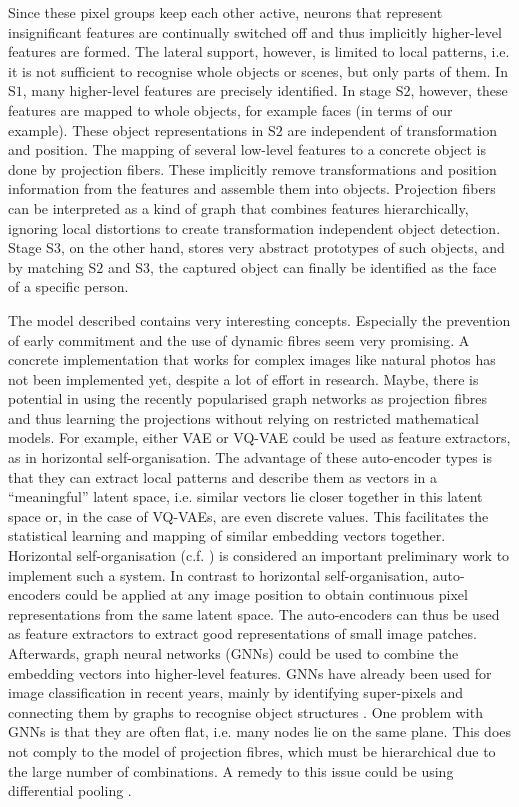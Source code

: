 Since these pixel groups keep each other active, neurons that represent insignificant features are continually switched off and thus implicitly higher-level features are formed. The lateral support, however, is limited to local patterns, i.e. it is not sufficient to recognise whole objects or scenes, but only parts of them. In S$1$, many higher-level features are precisely identified. In stage S$2$, however, these features are mapped to whole objects, for example faces (in terms of our example). These object representations in S$2$ are independent of transformation and position. The mapping of several low-level features to a concrete object is done by projection fibers. These implicitly remove transformations and position information from the features and assemble them into objects. Projection fibers can be interpreted as a kind of graph that combines features hierarchically, ignoring local distortions to create transformation independent object detection. Stage S$3$, on the other hand, stores very abstract prototypes of such objects, and by matching S$2$ and S$3$, the captured object can finally be identified as the face of a specific person.

The model described contains very interesting concepts. Especially the prevention of early commitment and the use of dynamic fibres seem very promising. A concrete implementation that works for complex images like natural photos has not been implemented yet, despite a lot of effort in research. Maybe,  there is potential in using the recently popularised graph networks as projection fibres and thus learning the projections without relying on restricted mathematical models. For example, either VAE or VQ-VAE could be used as feature extractors, as in horizontal self-organisation. The advantage of these auto-encoder types is that they can extract local patterns and describe them as vectors in a ``meaningful'' latent space, i.e. similar vectors lie closer together in this latent space or, in the case of VQ-VAEs, are even discrete values. This facilitates the statistical learning and mapping of similar embedding vectors together. Horizontal self-organisation (c.f. ) is considered an important preliminary work to implement such a system. In contrast to horizontal self-organisation, auto-encoders could be applied at any image position to obtain continuous pixel representations from the same latent space. The auto-encoders can thus be used as feature extractors to extract good representations of small image patches. Afterwards, graph neural networks (GNNs) could be used to combine the embedding vectors into higher-level features. GNNs have already been used for image classification in recent years, mainly by identifying super-pixels and connecting them by graphs to recognise object structures .  One problem with GNNs is that they are often flat, i.e. many nodes lie on the same plane. This does not comply to the model of projection fibres, which must be hierarchical due to the large number of combinations. A remedy to this issue could be using differential pooling .

